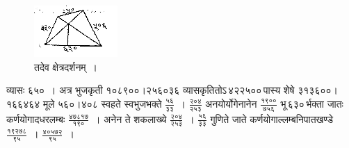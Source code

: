 \documentclass[11pt, openany]{book}
\begin{document}
\newpage
\begin{figure}[h!]
         \centering
           \captionsetup{labelformat=empty}
         \caption{तदेव क्षेत्रदर्शनम्~।}
         \includegraphics[scale=0.85]{graphics/capture182.png}
         \end{figure}
\vspace{-2mm}

व्यासः ६५०~। अत्र भुजकृती १०८९००।२५६०३६ व्यासकृतितोऽ\textendash \,४२२५००\textendash \,पास्य शेषे ३१३६००।१६६४६४ मूले ५६०।४०८ स्वहते स्वभुजभक्ते $\frac{\mbox{५६}}{\mbox{३३}}$~। $\frac{\mbox{२०४}}{\mbox{२५३}}$ अनयोर्योगेनानेन $\frac{\mbox{१९००}}{\mbox{७५६}}$ भू\textendash \,६३०\textendash \,र्भक्ता जातः कर्णयोगादधरलम्बः $\frac{\mbox{४७८१७}}{\mbox{१९०}}$~। अनेन ते शकलाख्ये $\frac{\mbox{२०४}}{\mbox{२५३}}$~। $\frac{\mbox{५६}}{\mbox{३३}}$ गुणिते जाते कर्णयोगाल्लम्बनिपातखण्डे $\frac{\mbox{१९२७८}}{\mbox{९५}}$~। $\frac{\mbox{४०५७२}}{\mbox{९५}}$~।\\
\end{document}
